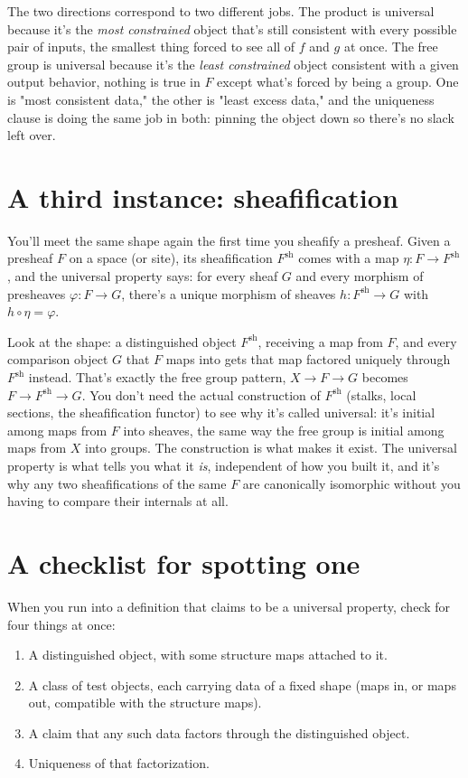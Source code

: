 The two directions correspond to two different jobs. The product is universal because it's the \emph{most constrained} object that's still consistent with every possible pair of inputs, the smallest thing forced to see all of $f$ and $g$ at once. The free group is universal because it's the \emph{least constrained} object consistent with a given output behavior, nothing is true in $F$ except what's forced by being a group. One is "most consistent data," the other is "least excess data," and the uniqueness clause is doing the same job in both: pinning the object down so there's no slack left over.

\section{A third instance: sheafification}

You'll meet the same shape again the first time you sheafify a presheaf. Given a presheaf $F$ on a space (or site), its sheafification $F^{\mathrm{sh}}$ comes with a map $\eta : F \to F^{\mathrm{sh}}$, and the universal property says: for every sheaf $G$ and every morphism of presheaves $\varphi : F \to G$, there's a unique morphism of sheaves $h : F^{\mathrm{sh}} \to G$ with $h \circ \eta = \varphi$.

Look at the shape: a distinguished object $F^{\mathrm{sh}}$, receiving a map from $F$, and every comparison object $G$ that $F$ maps into gets that map factored uniquely through $F^{\mathrm{sh}}$ instead. That's exactly the free group pattern, $X \to F \to G$ becomes $F \to F^{\mathrm{sh}} \to G$. You don't need the actual construction of $F^{\mathrm{sh}}$ (stalks, local sections, the sheafification functor) to see why it's called universal: it's initial among maps from $F$ into sheaves, the same way the free group is initial among maps from $X$ into groups. The construction is what makes it exist. The universal property is what tells you what it \emph{is}, independent of how you built it, and it's why any two sheafifications of the same $F$ are canonically isomorphic without you having to compare their internals at all.

\section{A checklist for spotting one}

When you run into a definition that claims to be a universal property, check for four things at once:

\begin{enumerate}
\item A distinguished object, with some structure maps attached to it.
\item A class of test objects, each carrying data of a fixed shape (maps in, or maps out, compatible with the structure maps).
\item A claim that any such data factors through the distinguished object.
\item Uniqueness of that factorization.
\end{enumerate}

